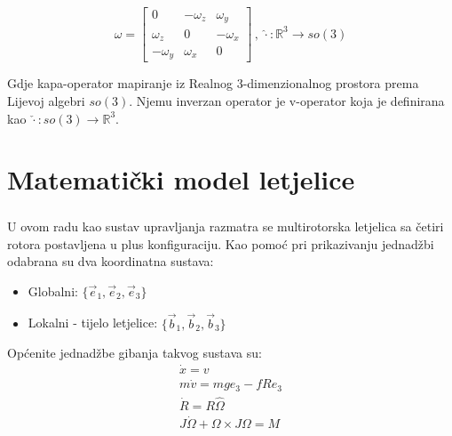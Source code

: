 \documentclass[times, utf8, diplomski]{fer}
\begin{document}
	\begin{equation}
		\hat{\omega} = 
		\begin{bmatrix}
			0			&	-\omega_z	& 	\omega_y \\
			\omega_z	&	0			& 	-\omega_x \\
			-\omega_y	&	\omega_x	&	0
		\end{bmatrix} \, , \, \hat{\cdot}: \mathbb{R}^3 \rightarrow so(3)
	\end{equation}
	
	\noindent Gdje kapa-operator mapiranje iz Realnog 3-dimenzionalnog prostora prema Lijevoj algebri $so(3)$. Njemu inverzan operator je v-operator koja je definirana kao $\check{\cdot}:so(3) \rightarrow \mathbb{R}^3$.
	
\chapter{Matematički model letjelice}

\paragraph{}U ovom radu kao sustav upravljanja razmatra se multirotorska letjelica sa četiri rotora postavljena u plus konfiguraciju. Kao pomoć pri prikazivanju jednadžbi odabrana su dva koordinatna sustava: 
\begin{itemize}
	\item Globalni: $\{\vec{e}_1, \vec{e}_2, \vec{e}_3\}$
	\item Lokalni - tijelo letjelice: $\{\vec{b}_1, \vec{b}_2, \vec{b}_3\}$
\end{itemize}

\noindent Općenite jednadžbe gibanja takvog sustava su:
\begin{gather}
	\dot{x} = v \\
	m \dot{v} = mge_3 - fRe_3 \\
	\dot{R} = R\hat{\Omega} \\
	J\dot{\Omega} + \Omega \times J\Omega = M
\end{gather}
\end{document}
